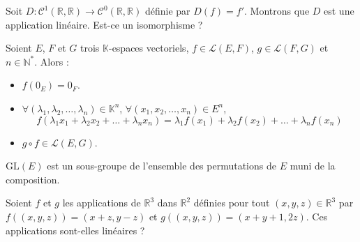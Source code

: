 \documentclass[a4paper,10pt]{report}
\begin{document}
\begin{ex} Soit $D : \mathcal{C}^1(\mathbb{R}, \mathbb{R}) \rightarrow \mathcal{C}^0(\mathbb{R}, \mathbb{R})$ définie par $D(f)=f'$. Montrons que $D$ est une application linéaire. Est-ce un isomorphisme ?


\vspace{5cm}
\end{ex}

\begin{prop}
Soient $E$, $F$ et $G$ trois $\mathbb{K}$-espaces vectoriels, $f \in \mathcal{L}(E,F)$, $g \in \mathcal{L}(F,G)$ et $n \in \mathbb{N}^*$. Alors :

\begin{itemize}
\item $f(0_E)=0_F$.
\item $\forall (\lambda_1, \lambda_2, \ldots, \lambda_n) \in \mathbb{K}^n$, $\forall (x_1,x_2, \ldots, x_n) \in E^n$,
$$ f( \lambda_1x_1+ \lambda_2 x_2 + \ldots + \lambda_n x_n) = \lambda_1 f(x_1) + \lambda_2 f(x_2) + \ldots + \lambda_n f(x_n) $$
\item $g \circ f \in \mathcal{L}(E,G)$.
\end{itemize}
\end{prop}

\begin{rem} $\textrm{GL}(E)$ est un sous-groupe de l'ensemble des permutations de $E$ muni de la composition.
\end{rem}

\begin{exa} Soient $f$ et $g$ les applications de $\mathbb{R}^3$ dans $\mathbb{R}^2$ définies pour tout $(x,y,z) \in \mathbb{R}^3$ par $f((x,y,z))=(x+z,y-z)$ et $g((x,y,z))= (x+y+1,2z)$. Ces applications sont-elles linéaires ?
\end{exa} 
\end{document}
